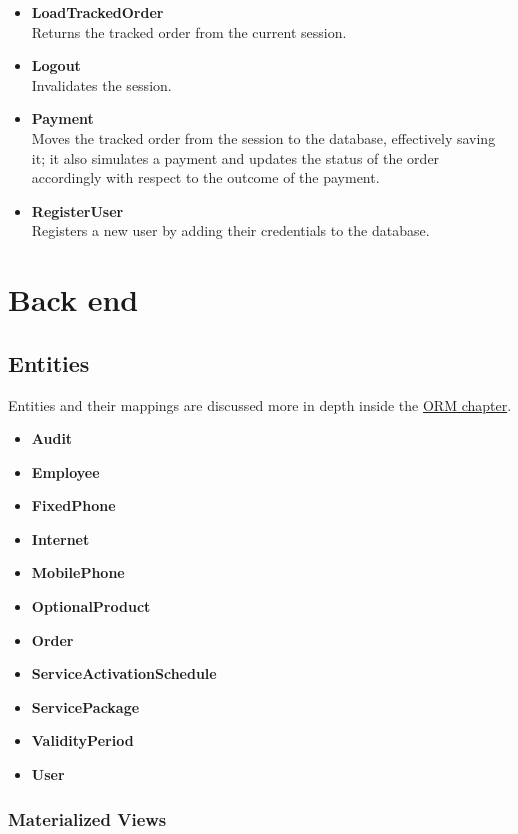 \begin{itemize}[leftmargin = \leftmargin + 1em, itemindent = -1em]
    \item \textbf{LoadTrackedOrder} \\
        Returns the tracked order from the current session.
    \item \textbf{Logout} \\
        Invalidates the session.
    \item \textbf{Payment} \\
        Moves the tracked order from the session to the database, effectively saving it; it also simulates a payment and updates the status of the order accordingly with respect to the outcome of the payment.
    \item \textbf{RegisterUser} \\
        Registers a new user by adding their credentials to the database.

\end{itemize}


\section{Back end}
\label{sec:back_end}

\subsection{Entities}

Entities and their mappings are discussed more in depth inside the \hyperref[chap:orm]{ORM chapter}.

\begin{itemize}
    \item \textbf{Audit}
    \item \textbf{Employee}
    \item \textbf{FixedPhone}
    \item \textbf{Internet}
    \item \textbf{MobilePhone}
    \item \textbf{OptionalProduct}
    \item \textbf{Order}
    \item \textbf{ServiceActivationSchedule}
    \item \textbf{ServicePackage}
    \item \textbf{ValidityPeriod}
    \item \textbf{User}
\end{itemize}

\subsubsection*{Materialized Views}

